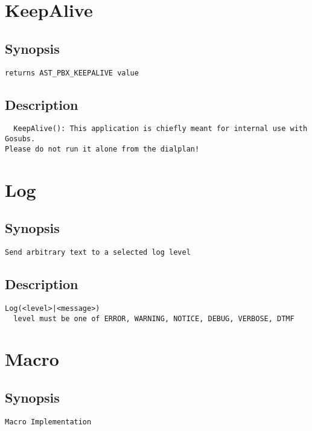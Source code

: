 \section{KeepAlive}
\subsection{Synopsis}
\begin{verbatim}
returns AST_PBX_KEEPALIVE value
\end{verbatim}
\subsection{Description}
\begin{verbatim}
  KeepAlive(): This application is chiefly meant for internal use with Gosubs.
Please do not run it alone from the dialplan!

\end{verbatim}


\section{Log}
\subsection{Synopsis}
\begin{verbatim}
Send arbitrary text to a selected log level
\end{verbatim}
\subsection{Description}
\begin{verbatim}
Log(<level>|<message>)
  level must be one of ERROR, WARNING, NOTICE, DEBUG, VERBOSE, DTMF

\end{verbatim}


\section{Macro}
\subsection{Synopsis}
\begin{verbatim}
Macro Implementation
\end{verbatim}

